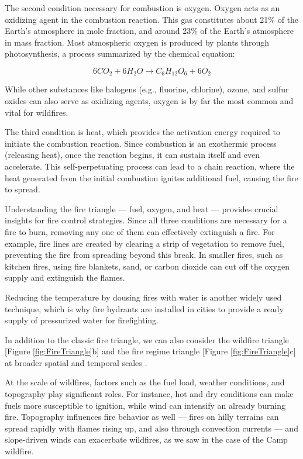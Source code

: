 \documentclass[
  12 pt,
]{Nemilov}
\begin{document}
The second condition necessary for combustion is oxygen. Oxygen acts as an oxidizing agent in the combustion reaction. This gas constitutes about 21\% of the Earth's atmosphere in mole fraction, and around 23\% of the Earth's atmosphere in mass fraction. Most atmospheric oxygen is produced by plants through photosynthesis, a process summarized by the chemical equation:

\[ 6CO_2 + 6H_2O \rightarrow C_6H_{12}O_6 + 6O_2 \]

While other substances like halogens (e.g., fluorine, chlorine), ozone, and sulfur oxides can also serve as oxidizing agents, oxygen is by far the most common and vital for wildfires.

The third condition is heat, which provides the activation energy required to initiate the combustion reaction. Since combustion is an exothermic process (releasing heat), once the reaction begins, it can sustain itself and even accelerate. This self-perpetuating process can lead to a chain reaction, where the heat generated from the initial combustion ignites additional fuel, causing the fire to spread.

Understanding the fire triangle --- fuel, oxygen, and heat --- provides crucial insights for fire control strategies. Since all three conditions are necessary for a fire to burn, removing any one of them can effectively extinguish a fire. For example, fire lines are created by clearing a strip of vegetation to remove fuel, preventing the fire from spreading beyond this break. In smaller fires, such as kitchen fires, using fire blankets, sand, or carbon dioxide can cut off the oxygen supply and extinguish the flames.

Reducing the temperature by dousing fires with water is another widely used technique, which is why fire hydrants are installed in cities to provide a ready supply of pressurized water for firefighting.

In addition to the classic fire triangle, we can also consider the wildfire triangle {[}Figure \ref{fig:FireTriangle}b{]} and the fire regime triangle {[}Figure \ref{fig:FireTriangle}c{]} at broader spatial and temporal scales \citep{moritz2005wildfires}.

At the scale of wildfires, factors such as the fuel load, weather conditions, and topography play significant roles. For instance, hot and dry conditions can make fuels more susceptible to ignition, while wind can intensify an already burning fire. Topography influences fire behavior as well --- fires on hilly terrains can spread rapidly with flames rising up, and also through convection currents --- and slope-driven winds can exacerbate wildfires, as we saw in the case of the Camp wildfire.
\end{document}
